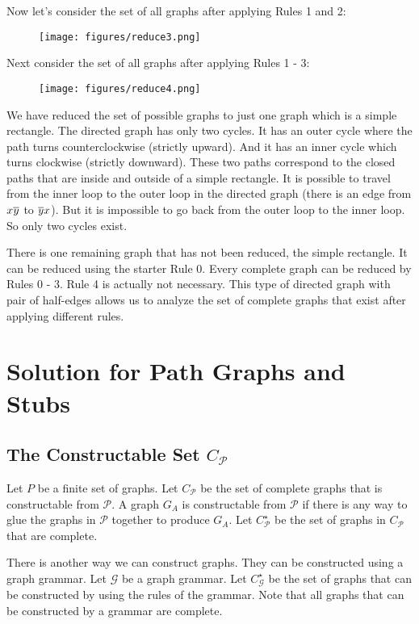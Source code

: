 \documentclass[acmtog]{acmart}
\begin{document}
Now let's consider the set of all graphs after applying Rules 1 and 2:

\begin{figure}[H]
\centering
\texttt{[image: figures/reduce3.png]}
\end{figure}

Next consider the set of all graphs after applying Rules 1 - 3:

\begin{figure}[H]
\centering
\texttt{[image: figures/reduce4.png]}
\end{figure}

We have reduced the set of possible graphs to just one graph which is a simple rectangle.
The directed graph has only two cycles. It has an outer cycle where the path
turns counterclockwise (strictly upward). And it has an inner cycle
which turns clockwise (strictly downward). These two paths correspond to the
closed paths that are inside and outside of a simple rectangle. It is possible to travel
from the inner loop to the outer loop in the directed graph (there is an edge
from $x\overline{y}$ to $\overline{y}x$). But it is impossible to
go back from the outer loop to the inner loop. So only two cycles exist.

There is one remaining graph that has not been reduced, the simple rectangle. It can be reduced using
the starter Rule 0. Every complete graph can be reduced by Rules 0 - 3. Rule 4
is actually not necessary. This type of directed graph with pair of half-edges
allows us to analyze the set of complete graphs that exist after applying
different rules.

\section{Solution for Path Graphs and Stubs}

\subsection{The Constructable Set $C_{\mathcal{P}}$}

Let $P$ be a finite set of graphs. Let $C_{\mathcal{P}}$ be the set of 
complete graphs that is constructable from $\mathcal{P}$. A graph $G_A$ is
constructable from $\mathcal{P}$ if there is any way to glue the graphs in
$\mathcal{P}$ together to produce $G_A$. Let $C^{\star}_{\mathcal{P}}$ be the
set of graphs in $C_{\mathcal{P}}$ that are complete.

There is another way we can construct graphs. They can be constructed using a
graph grammar. Let $\mathcal{G}$ be a graph grammar. Let
$C^{\star}_{\mathcal{G}}$ be the set of graphs that can be constructed by using
the rules of the grammar. Note that all graphs that can be constructed by a
grammar are complete.
\end{document}
